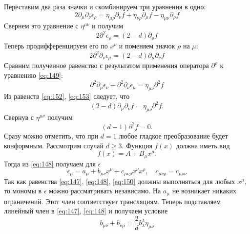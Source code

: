 \documentclass[a4paper,12pt]{article}
\theoremstyle{definition}
\theoremstyle{definition}
\theoremstyle{definition}
\begin{document}
Переставим два раза значки и скомбинируем три уравнения в одно:
\begin{equation}
  \label{eq:150}
  2\partial_{\mu}\partial_{\nu}\epsilon_{\rho}=\eta_{\mu\rho}\partial_{\nu} f+\eta_{\nu\rho}\partial_{\mu}f-\eta_{\mu\nu}\partial_{\rho}f
\end{equation}
Свернем это уравнение с $\eta^{\mu\nu}$ и получим
\begin{equation}
  \label{eq:151}
  2\partial^2 \epsilon_{\rho}=(2-d)\partial_{\rho}f
\end{equation}
Теперь продифференцируем его по $x^{\nu}$ и поменяем значок $\rho$ на $\mu$:
\begin{equation}
  \label{eq:152}
  2\partial^2 \partial_{\nu} \epsilon_{\mu}=(2-d)\partial_{\mu}\partial_{\nu} f
\end{equation}
Сравним полученное равенство с результатом применения оператора $\partial^{\rho}$ к уравнению
\eqref{eq:149}: 
\begin{equation}
  \label{eq:153}
  \partial^2 \partial_{\mu}\epsilon_{\nu}+\partial^2 \partial_{\nu}\epsilon_{\mu}=\eta_{\mu\nu}\partial^2 f
\end{equation}
Из равенств \eqref{eq:152}, \eqref{eq:153} следует, что
\begin{equation}
  \label{eq:154}
  (2-d)\partial_{\mu}\partial_{\nu}f=\eta_{\mu\nu}\partial^2 f.
\end{equation}
Свернув с $\eta^{\mu\nu}$ получим
\begin{equation}
  \label{eq:155}
  (d-1)\partial^2 f =0.
\end{equation}
Сразу можно отметить, что при $d=1$ любое гладкое преобразование будет конформным. Рассмотрим случай
$d\geq 3$. Функция $f(x)$ должна иметь вид 
\begin{equation}
  \label{eq:156}
  f(x)=A+B_{\mu}x^{\mu}.
\end{equation}
Тогда из \eqref{eq:148} получаем для $\epsilon$
\begin{equation}
  \label{eq:157}
  \epsilon_{\mu}=a_{\mu}+b_{\mu\nu}x^{\nu} +c_{\mu\nu\rho}x^{\nu}x^{\rho},\quad c_{\mu\nu\rho}=c_{\mu\rho\nu}
\end{equation}
Так как равенства \eqref{eq:147}, \eqref{eq:148}, \eqref{eq:150} должны выполняться для любых
$x^{\mu}$, то мономы в $\epsilon$ можно рассматривать независимо. На $a_{\mu}$ не возникает никаких
ограничений. Этот член соответствует трансляциям. Теперь подставляем линейный член в \eqref{eq:147},
\eqref{eq:148} и получаем условие 
\begin{equation}
  \label{eq:158}
  b_{\mu\nu}+b_{\nu\mu}=\frac{2}{d}b^{\lambda}_{\lambda}\eta_{\mu\nu}
\end{equation}
\end{document}
